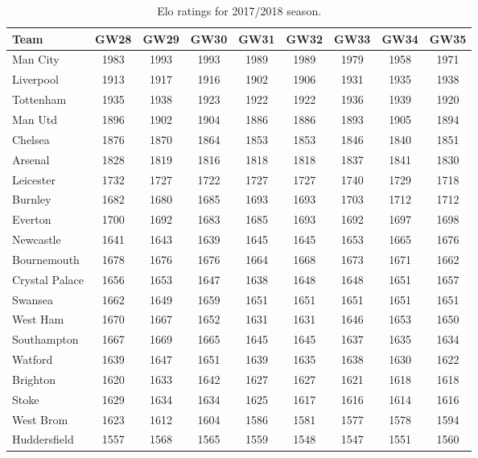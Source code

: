 \begin{table}[H]
\centering
\smaller
\begin{tabular}{|l|c|c|c|c|c|c|c|c|}
\hline
Team           & GW28 & GW29 & GW30 & GW31 & GW32 & GW33 & GW34 & GW35 \\
\hline
Man City  \Tstrut     & 1983 & 1993 & 1993 & 1989 & 1989 & 1979 & 1958 & 1971 \\
Liverpool      & 1913 & 1917 & 1916 & 1902 & 1906 & 1931 & 1935 & 1938 \\
Tottenham      & 1935 & 1938 & 1923 & 1922 & 1922 & 1936 & 1939 & 1920 \\
Man Utd        & 1896 & 1902 & 1904 & 1886 & 1886 & 1893 & 1905 & 1894 \\
Chelsea        & 1876 & 1870 & 1864 & 1853 & 1853 & 1846 & 1840 & 1851 \\
Arsenal        & 1828 & 1819 & 1816 & 1818 & 1818 & 1837 & 1841 & 1830 \\
Leicester      & 1732 & 1727 & 1722 & 1727 & 1727 & 1740 & 1729 & 1718 \\
Burnley        & 1682 & 1680 & 1685 & 1693 & 1693 & 1703 & 1712 & 1712 \\
Everton        & 1700 & 1692 & 1683 & 1685 & 1693 & 1692 & 1697 & 1698 \\
Newcastle      & 1641 & 1643 & 1639 & 1645 & 1645 & 1653 & 1665 & 1676 \\
Bournemouth    & 1678 & 1676 & 1676 & 1664 & 1668 & 1673 & 1671 & 1662 \\
Crystal Palace & 1656 & 1653 & 1647 & 1638 & 1648 & 1648 & 1651 & 1657 \\
Swansea        & 1662 & 1649 & 1659 & 1651 & 1651 & 1651 & 1651 & 1651 \\
West Ham       & 1670 & 1667 & 1652 & 1631 & 1631 & 1646 & 1653 & 1650 \\
Southampton    & 1667 & 1669 & 1665 & 1645 & 1645 & 1637 & 1635 & 1634 \\
Watford        & 1639 & 1647 & 1651 & 1639 & 1635 & 1638 & 1630 & 1622 \\
Brighton       & 1620 & 1633 & 1642 & 1627 & 1627 & 1621 & 1618 & 1618 \\
Stoke          & 1629 & 1634 & 1634 & 1625 & 1617 & 1616 & 1614 & 1616 \\
West Brom      & 1623 & 1612 & 1604 & 1586 & 1581 & 1577 & 1578 & 1594 \\
Huddersfield \Bstrut  & 1557 & 1568 & 1565 & 1559 & 1548 & 1547 & 1551 & 1560 \\
\hline
\end{tabular}
\caption{Elo ratings for 2017/2018 season.}
\label{tab:elo_values_gameweeks_4}
\end{table}


